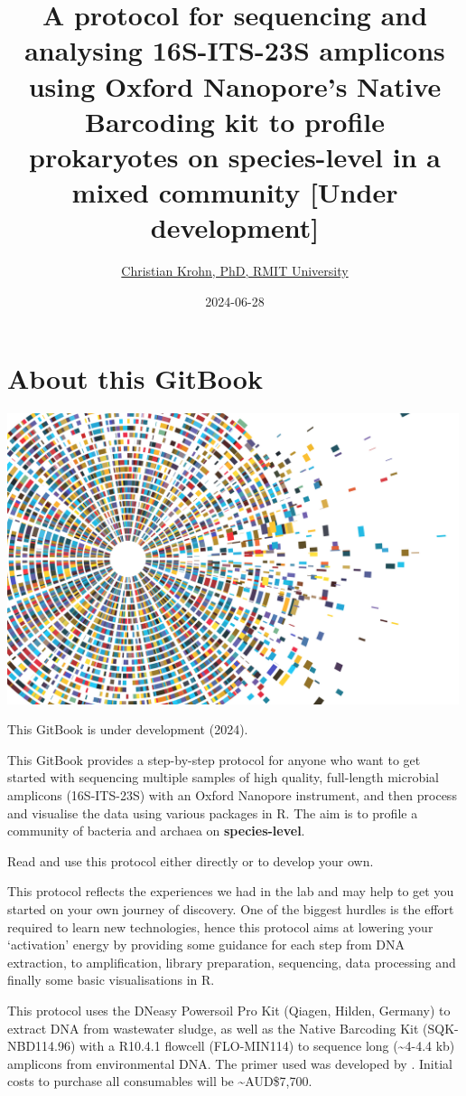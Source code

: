 \documentclass[
]{book}
\title{A protocol for sequencing and analysing 16S-ITS-23S amplicons using Oxford Nanopore's Native Barcoding kit to profile prokaryotes on species-level in a mixed community {[}Under development{]}}
\author{\href{https://www.rmit.edu.au/contact/staff-contacts/academic-staff/k/krohn---christian}{Christian Krohn, PhD, RMIT University}}
\date{2024-06-28}
\begin{document}
\maketitle

{
\setcounter{tocdepth}{1}
\tableofcontents
}
\chapter{About this GitBook}\label{about}

\includegraphics[width=5.20833in,height=\textheight]{./img/vectorstock_23650232.jpg}

This GitBook is under development (2024).

This GitBook provides a step-by-step protocol for anyone who want to get started with sequencing multiple samples of high quality, full-length microbial amplicons (16S-ITS-23S) with an Oxford Nanopore instrument, and then process and visualise the data using various packages in R. The aim is to profile a community of bacteria and archaea on \textbf{species-level}.

Read and use this protocol either directly or to develop your own.

This protocol reflects the experiences we had in the lab and may help to get you started on your own journey of discovery. One of the biggest hurdles is the effort required to learn new technologies, hence this protocol aims at lowering your `activation' energy by providing some guidance for each step from DNA extraction, to amplification, library preparation, sequencing, data processing and finally some basic visualisations in R.

This protocol uses the DNeasy Powersoil Pro Kit (Qiagen, Hilden, Germany) to extract DNA from wastewater sludge, as well as the Native Barcoding Kit (SQK-NBD114.96) with a R10.4.1 flowcell (FLO-MIN114) to sequence long (\textasciitilde4-4.4 kb) amplicons from environmental DNA. The primer used was developed by \citep{Martijn2019}. Initial costs to purchase all consumables will be \textasciitilde AUD\$7,700.
\end{document}
